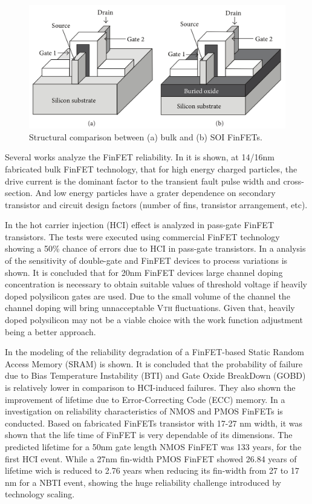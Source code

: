 \documentclass[ecp,tc, english]{iiufrgs}
\begin{document}
\begin{figure}[H]
\centering
\includegraphics[width=\textwidth, trim={0 0cm 0 0cm},clip]{finfet2.png}
\caption{Structural comparison between (a) bulk and (b) SOI FinFETs.}
\label{bulkvssoi}
\end{figure}



Several works analyze the FinFET reliability. In \cite{FinFET01} it is shown, at 14/16nm fabricated bulk FinFET technology, that for high energy charged particles, the drive current is the dominant factor to the transient fault pulse width and cross-section. And low energy particles have a grater dependence on secondary transistor and circuit design factors (number of fins, transistor arrangement, etc). 

In \cite{FinFET02} the hot carrier injection (HCI) effect is analyzed in pass-gate FinFET transistors. The tests were executed using commercial FinFET technology showing a 50\% chance of errors due to HCI in pass-gate transistors. In \cite{FinFET03} a analysis of the sensitivity of double-gate and FinFET devices to process variations is shown. It is concluded that for 20nm FinFET devices large channel doping concentration is necessary to obtain suitable values of threshold voltage if heavily doped polysilicon gates are used. Due to the small volume of the channel the channel doping will bring unnacceptable V\textsc{th} fluctuations. Given that, heavily doped polysilicon may not be a viable choice with the work function adjustment being a better approach. 

In \cite{FinFET04} the modeling of the reliability degradation of a FinFET-based Static Random Access Memory (SRAM) is shown. It is concluded that the probability of failure due to Bias Temperature Instability (BTI) and Gate Oxide BreakDown (GOBD) is relatively lower in comparison to HCI-induced failures. They also shown the improvement of lifetime due to Error-Correcting Code (ECC) memory. In \cite{FINFET05} a investigation on reliability characteristics of NMOS and PMOS FinFETs is conducted. Based on fabricated FinFETs transistor with 17-27 nm width, it was shown that the life time of FinFET is very dependable of its dimensions. The predicted lifetime for a 50nm gate length NMOS FinFET was 133 years, for the first HCI event. While a 27nm fin-width PMOS FinFET showed 26.84 years of lifetime wich is reduced to 2.76 years when reducing its fin-width from 27 to 17 nm for a NBTI event, showing the huge reliability challenge introduced by technology scaling.
\end{document}

